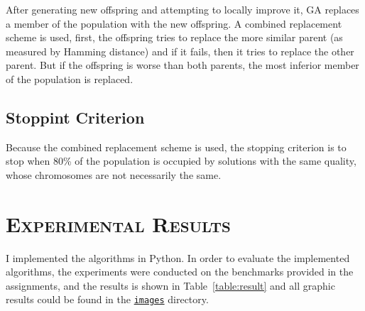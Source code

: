 \documentclass[11pt]{article}
\begin{document}
After generating new offspring and attempting to locally improve it, GA replaces a member of 
the population with the new offspring. A combined replacement scheme is used, first, the offspring 
tries to replace the more similar parent (as measured by Hamming distance) and if it fails, then 
it tries to replace the other parent. But if the offspring is worse than both parents, the most 
inferior member of the population is replaced.

\subsection{Stoppint Criterion}

Because the combined replacement scheme is used, the stopping criterion is to stop when 80\% of 
the population is occupied by solutions with the same quality, whose chromosomes are not necessarily 
the same.


\section{\textsc{Experimental Results}}

I implemented the algorithms in Python. In order to evaluate the implemented algorithms, the 
experiments were conducted on the benchmarks provided in the assignments, and the results is shown 
in Table~\ref{table:result} and all graphic results could be found in the \href{https://github.com/ZhenpengWu/Genetic-Partitioning/tree/master/docs/images}{\texttt{images}} directory.
\end{document}
